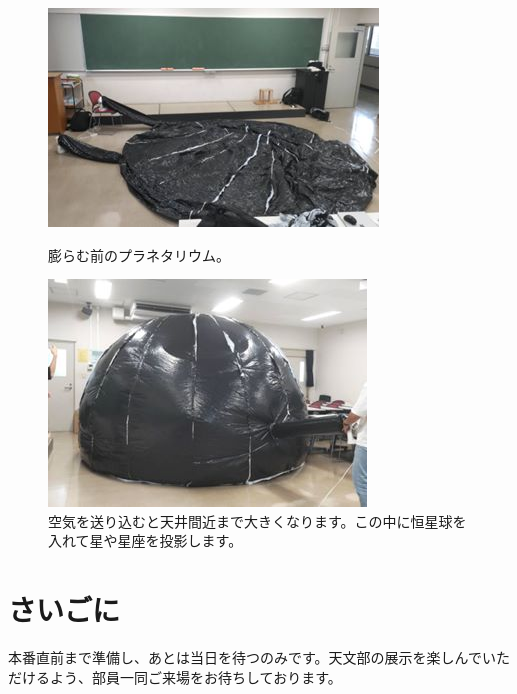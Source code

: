 \documentclass[../super_nova_20yy]{subfiles}
\begin{document}
\begin{figure}[H]
  \centering
  \begin{minipage}[t]{0.4\columnwidth}
    \centering
    \includegraphics[width=\columnwidth]{画像9.jpg}
    \caption{膨らむ前のプラネタリウム。}
    \label{fig:9}
  \end{minipage}
  \begin{minipage}[t]{0.4\columnwidth}
    \centering
    \includegraphics[width=\columnwidth]{画像10.jpg}
    \caption{空気を送り込むと天井間近まで大きくなります。この中に恒星球を入れて星や星座を投影します。}
    \label{fig:10}
  \end{minipage}
\end{figure}

\section{さいごに}
本番直前まで準備し、あとは当日を待つのみです。天文部の展示を楽しんでいただけるよう、部員一同ご来場をお待ちしております。

\onecolumn
\end{document}
